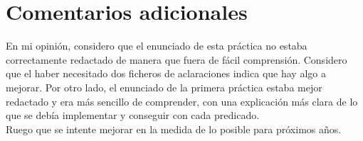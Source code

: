 \documentclass[12pt, a4paper, spanish]{article}
\begin{document}
\newpage
\section{Comentarios adicionales}

En mi opinión, considero que el enunciado de esta práctica no estaba correctamente redactado de manera que fuera de fácil comprensión. Considero que el haber necesitado dos ficheros de aclaraciones indica que hay algo a mejorar. Por otro lado, el enunciado de la primera práctica estaba mejor redactado y era más sencillo de comprender, con una explicación más clara de lo que se debía implementar y conseguir con cada predicado.\\

Ruego que se intente mejorar en la medida de lo posible para próximos años.
\end{document}
